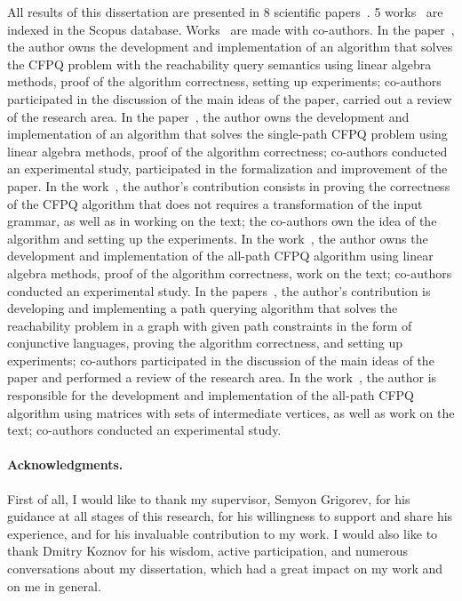 All results of this dissertation are presented in 8 scientific papers~\cite{azimov1,azimov2,azimov3,azimov4,azimov5,azimov6,azimov7,azimov8}. %
5 works~\cite{azimov1,azimov2,azimov3,azimov4,azimov5} are indexed in the Scopus database. Works~\cite{azimov1,azimov2,azimov3,azimov4,azimov6,azimov7,azimov8} are made with co-authors. In the paper~\cite{azimov1}, the author owns the development and implementation of an algorithm that solves the CFPQ problem with the reachability query semantics using linear algebra methods, proof of the algorithm correctness, setting up experiments; co-authors participated in the discussion of the main ideas of the paper, carried out a review of the research area. In the paper~\cite{azimov2}, the author owns the development and implementation of an algorithm that solves the single-path CFPQ problem using linear algebra methods, proof of the algorithm correctness; co-authors conducted an experimental study, participated in the formalization and improvement of the paper. In the work~\cite{azimov3}, the author's contribution consists in proving the correctness of the CFPQ algorithm that does not requires a transformation of the input grammar, as well as in working on the text; the co-authors own the idea of the algorithm and setting up the experiments. In the work~\cite{azimov4}, the author owns the development and implementation of the all-path CFPQ algorithm using linear algebra methods, proof of the algorithm correctness, work on the text; co-authors conducted an experimental study. In the papers~\cite{azimov6,azimov7}, the author's contribution is developing and implementing a path querying algorithm that solves the reachability problem in a graph with given path constraints in the form of conjunctive languages, proving the algorithm correctness, and setting up experiments; co-authors participated in the discussion of the main ideas of the paper and performed a review of the research area. In the work~\cite{azimov8}, the author is responsible for the development and implementation of the all-path CFPQ algorithm using matrices with sets of intermediate vertices, as well as work on the text; co-authors conducted an experimental study.

\paragraph{Acknowledgments.} First of all, I would like to thank my supervisor, Semyon Grigorev, for his guidance at all stages of this research, for his willingness to support and share his experience, and for his invaluable contribution to my work. I would also like to thank Dmitry Koznov for his wisdom, active participation, and numerous conversations about my dissertation, which had a great impact on my work and on me in general.

